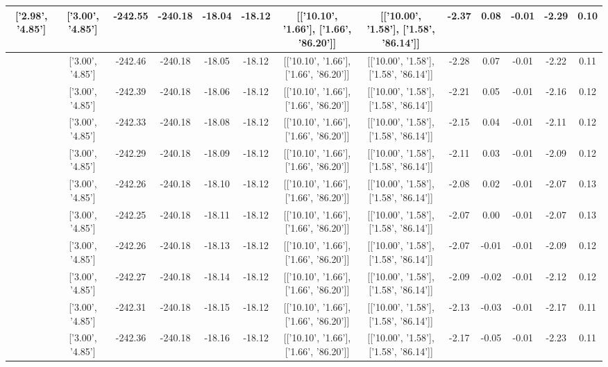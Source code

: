 \begin{table}[htbp]
\begin{adjustbox}{angle=90}
\begin{tabular}{|c|c|c|c|c|c|c|c|c|c|c|c|c|}
 ['2.98', '4.85'] & ['3.00', '4.85'] & -242.55 & -240.18 & -18.04 & -18.12 & [['10.10', '1.66'], ['1.66', '86.20']] & [['10.00', '1.58'], ['1.58', '86.14']] & -2.37 & 0.08 & -0.01 & -2.29 & 0.10\\ \hline
 ['2.98', '4.85'] & ['3.00', '4.85'] & -242.46 & -240.18 & -18.05 & -18.12 & [['10.10', '1.66'], ['1.66', '86.20']] & [['10.00', '1.58'], ['1.58', '86.14']] & -2.28 & 0.07 & -0.01 & -2.22 & 0.11\\ \hline
 ['2.98', '4.85'] & ['3.00', '4.85'] & -242.39 & -240.18 & -18.06 & -18.12 & [['10.10', '1.66'], ['1.66', '86.20']] & [['10.00', '1.58'], ['1.58', '86.14']] & -2.21 & 0.05 & -0.01 & -2.16 & 0.12\\ \hline
 ['2.99', '4.85'] & ['3.00', '4.85'] & -242.33 & -240.18 & -18.08 & -18.12 & [['10.10', '1.66'], ['1.66', '86.20']] & [['10.00', '1.58'], ['1.58', '86.14']] & -2.15 & 0.04 & -0.01 & -2.11 & 0.12\\ \hline
 ['2.99', '4.85'] & ['3.00', '4.85'] & -242.29 & -240.18 & -18.09 & -18.12 & [['10.10', '1.66'], ['1.66', '86.20']] & [['10.00', '1.58'], ['1.58', '86.14']] & -2.11 & 0.03 & -0.01 & -2.09 & 0.12\\ \hline
 ['2.99', '4.85'] & ['3.00', '4.85'] & -242.26 & -240.18 & -18.10 & -18.12 & [['10.10', '1.66'], ['1.66', '86.20']] & [['10.00', '1.58'], ['1.58', '86.14']] & -2.08 & 0.02 & -0.01 & -2.07 & 0.13\\ \hline
 ['3.00', '4.85'] & ['3.00', '4.85'] & -242.25 & -240.18 & -18.11 & -18.12 & [['10.10', '1.66'], ['1.66', '86.20']] & [['10.00', '1.58'], ['1.58', '86.14']] & -2.07 & 0.00 & -0.01 & -2.07 & 0.13\\ \hline
 ['3.00', '4.85'] & ['3.00', '4.85'] & -242.26 & -240.18 & -18.13 & -18.12 & [['10.10', '1.66'], ['1.66', '86.20']] & [['10.00', '1.58'], ['1.58', '86.14']] & -2.07 & -0.01 & -0.01 & -2.09 & 0.12\\ \hline
 ['3.01', '4.85'] & ['3.00', '4.85'] & -242.27 & -240.18 & -18.14 & -18.12 & [['10.10', '1.66'], ['1.66', '86.20']] & [['10.00', '1.58'], ['1.58', '86.14']] & -2.09 & -0.02 & -0.01 & -2.12 & 0.12\\ \hline
 ['3.01', '4.85'] & ['3.00', '4.85'] & -242.31 & -240.18 & -18.15 & -18.12 & [['10.10', '1.66'], ['1.66', '86.20']] & [['10.00', '1.58'], ['1.58', '86.14']] & -2.13 & -0.03 & -0.01 & -2.17 & 0.11\\ \hline
 ['3.01', '4.85'] & ['3.00', '4.85'] & -242.36 & -240.18 & -18.16 & -18.12 & [['10.10', '1.66'], ['1.66', '86.20']] & [['10.00', '1.58'], ['1.58', '86.14']] & -2.17 & -0.05 & -0.01 & -2.23 & 0.11\\ \hline

\end{tabular}
\end{adjustbox}
\end{table}
